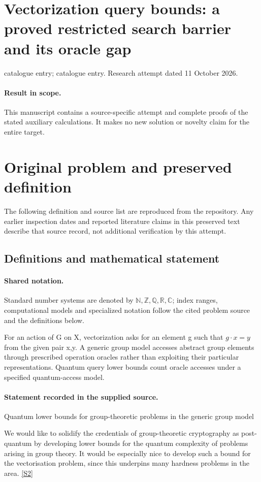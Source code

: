 \documentclass[11pt]{article}
\begin{document}
\section*{Vectorization query bounds: a proved restricted search barrier and its oracle gap}
\noindent catalogue entry; catalogue entry. Research attempt dated 11 October 2026.
\paragraph{Result in scope.}This manuscript contains a source-specific attempt and complete proofs of the stated auxiliary calculations. It makes no new solution or novelty claim for the entire target.
\section{Original problem and preserved definition}
The following definition and source list are reproduced from the repository. Any earlier inspection dates and reported literature claims in this preserved text describe that source record, not additional verification by this attempt.
\subsection{Definitions and mathematical statement}

\paragraph{Shared notation.}Standard number systems are denoted by $\mathbb N,\mathbb Z,\mathbb Q,\mathbb R,\mathbb C$; index ranges, computational models and specialized notation follow the cited problem source and the definitions below.


For an action of G on X, vectorization asks for an element g such that $g\cdot x=y$ from the given pair x,y. A generic group model accesses abstract group elements through prescribed operation oracles rather than exploiting their particular representations. Quantum query lower bounds count oracle accesses under a specified quantum-access model.
\paragraph{Statement recorded in the supplied source.}
Quantum lower bounds for group-theoretic problems in the generic group model

We would like to solidify the credentials of group-theoretic cryptography as post-quantum by developing lower bounds for the quantum complexity of problems arising in group theory. It would be especially nice to develop such a bound for the vectorisation problem, since this underpins many hardness problems in the area. \href{http://aimpl.org/postquantgroup/1/}{[S2]}
\end{document}
